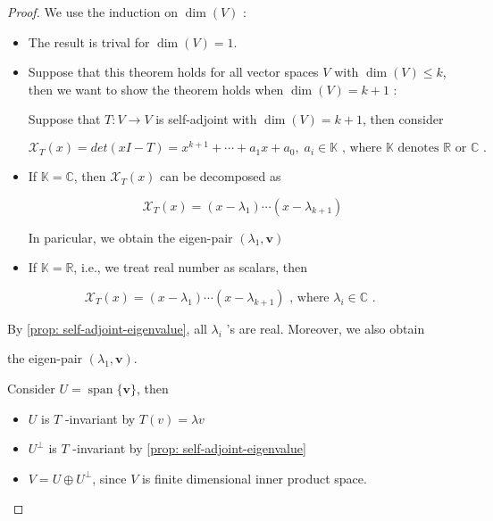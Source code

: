\begin{proof}
We use the induction on \(\dim \left( V\right)\) :

\begin{itemize}
\item The result is trival for \(\dim \left( V\right)  = 1\).

\item Suppose that this theorem holds for all vector spaces \(V\) with \(\dim \left( V\right)  \leq  k\), then we want to show the theorem holds when \(\dim \left( V\right)  = k + 1\) :

Suppose that \(T : V \rightarrow  V\) is self-adjoint with \(\dim \left( V\right)  = k + 1\), then consider

\[
{\mathcal{X}}_{T}\left( x\right)  = det(xI - T) = {x}^{k + 1} + \cdots  + {a}_{1}x + {a}_{0},\;{a}_{i} \in  \mathbb{K}\text{ , where }\mathbb{K}\text{ denotes }\mathbb{R}\text{ or }\mathbb{C}\text{ . }
\]


\item If \(\mathbb{K} = \mathbb{C}\), then \({\mathcal{X}}_{T}\left( x\right)\) can be decomposed as

\[
{\mathcal{X}}_{T}\left( x\right)  = \left( {x - {\lambda }_{1}}\right) \cdots \left( {x - {\lambda }_{k + 1}}\right)
\]

In paricular, we obtain the eigen-pair \(\left( {{\lambda }_{1},\mathbf{v}}\right)\)

\item If \(\mathbb{K} = \mathbb{R}\), i.e., we treat real number as scalars, then
\end{itemize}

\[
{\mathcal{X}}_{T}\left( x\right)  = \left( {x - {\lambda }_{1}}\right) \cdots \left( {x - {\lambda }_{k + 1}}\right) \text{ , where }{\lambda }_{i} \in  \mathbb{C}\text{ . }
\]

By \autoref{prop: self-adjoint-eigenvalue}, all \({\lambda }_{i}\) ’s are real. Moreover, we also obtain

the eigen-pair \(\left( {{\lambda }_{1},\mathbf{v}}\right)\).
\newline

Consider \(U = \operatorname{span}\{ \mathbf{v}\}\), then

\begin{itemize}
\item \(U\) is \(T\) -invariant by \(T(v) = \lambda v\)
\item \({U}^{ \bot  }\) is \(T\) -invariant by \autoref{prop: self-adjoint-eigenvalue}
\item \(V = U \oplus  {U}^{ \bot  }\), since \(V\) is finite dimensional inner product space.
\end{itemize}


\end{proof}
